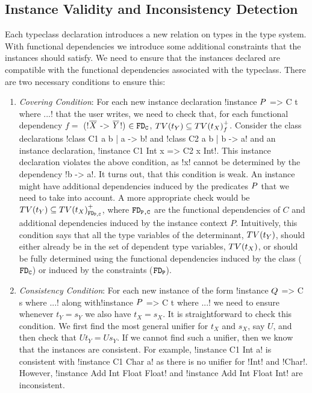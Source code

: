 \documentclass[format=sigplan,manuscript,review,screen,nonacm,margin=1in]{acmart}
\begin{document}
\subsection{Instance Validity and Inconsistency Detection}
Each typeclass declaration introduces a new relation on types in the type system. With functional dependencies
we introduce some additional constraints that the instances should satisfy.
We need to ensure that the instances declared are compatible
with the functional dependencies associated with the typeclass.
There are two necessary conditions to ensure this:
\begin{enumerate}[topsep={0pt},partopsep={0pt}]
\item\emph{Covering Condition}:  For each new instance declaration !instance $P$ => C t where ...!
  that the user writes, we need to check that, for each functional dependency
  $f =$ (!$\overline{X}$ -> $\overline{Y}$!) $\in \texttt{FD}_\texttt{C}$,
  $TV(t_Y) \subseteq {TV(t_X)}^{+}_{f}$. Consider the class declarations !class C1 a b | a -> b!
  and !class C2 a b | b -> a! and an instance declaration,
  !instance C1 Int x => C2 x Int!. This instance declaration violates the above condition,
  as !x! cannot be determined by the dependency !b -> a!.
  It turns out, that this condition is weak\cite{jones_language_2008}.
  An instance might have additional dependencies induced by the predicates $P$
  that we need to take into account. A more appropriate check would be
  $TV(t_Y) \subseteq {TV(t_X)}^{+}_{\texttt{FD}_\texttt{{P,C}}}$,
  where $\texttt{FD}_\texttt{{P,C}}$ are the functional dependencies of $C$ and additional dependencies
  induced by the instance context $P$. Intuitively, this condition says that
  all the type variables of the determinant, $TV(t_Y)$, should either already be in the
  set of dependent type variables, $TV(t_X)$, or should be fully determined using the
  functional dependencies induced by the class ($\texttt{FD}_\texttt{C}$) or induced by the constraints ($\texttt{FD}_\texttt{P}$).
\item\emph{Consistency Condition}: For each new instance of the form !instance $Q$ => C s where ...!
  along with\newline !instance $P$ => C t where ...! we need to ensure whenever $t_Y = s_Y$ we also have $t_X = s_X$.
  It is straightforward to check this condition. We first find the most general unifier for $t_X$ and $s_X$,
  say $U$, and then check that $U t_Y = U s_Y$. If we cannot find such a unifier, then we know that
  the instances are consistent. For example, !instance C1 Int a! is consistent with !instance C1 Char a!
  as there is no unifier for !Int! and !Char!. However, !instance Add Int Float Float!
  and !instance Add Int Float Int! are inconsistent.
\end{enumerate}
\end{document}
